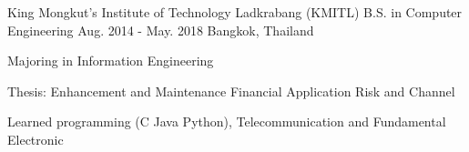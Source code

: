

\begin{cventries}

    \cventry
    {King Mongkut's Institute of Technology Ladkrabang (KMITL)} %
    {B.S. in Computer Engineering} %
    {Aug. 2014 - May. 2018} %
    {Bangkok, Thailand} %
    {
    \begin{cvitems} %
        \item {Majoring in Information Engineering}
        \item {Thesis: Enhancement and Maintenance Financial Application Risk and Channel}
        \item {Learned programming (C Java Python), Telecommunication and Fundamental Electronic}
    \end{cvitems}
    }

\end{cventries}
